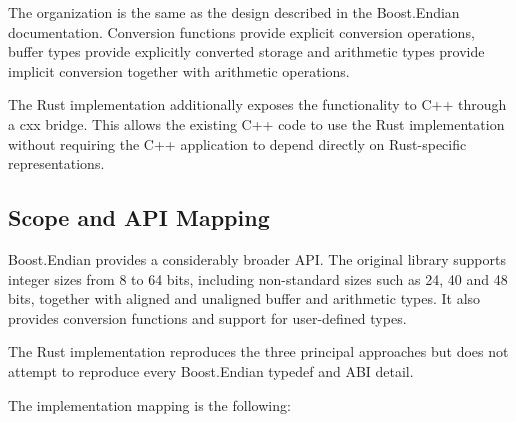 The organization is the same as the design described in the Boost.Endian documentation. Conversion functions provide 
explicit conversion operations, buffer types provide explicitly converted storage and arithmetic types provide 
implicit conversion together with arithmetic operations.

The Rust implementation additionally exposes the functionality to C++ through a cxx bridge. This allows the existing C++ 
code to use the Rust implementation without requiring the C++ application to depend directly on Rust-specific representations.

\subsection{Scope and API Mapping}
Boost.Endian provides a considerably broader API. The original library supports integer sizes from 8 to 64 bits, 
including non-standard sizes such as 24, 40 and 48 bits, together with aligned and unaligned buffer and arithmetic types. 
It also provides conversion functions and support for user-defined types.

The Rust implementation reproduces the three principal approaches but does not attempt to reproduce every Boost.Endian 
typedef and ABI detail.

The implementation mapping is the following:

